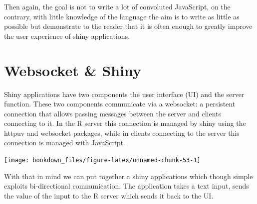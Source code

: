 \documentclass[
]{krantz}
\makeatletter
\newenvironment{Shaded}{\begin{snugshade}}{\end{snugshade}}
\newcommand{\ControlFlowTok}[1]{\textcolor[rgb]{0.27,0.27,0.27}{\textbf{#1}}}
\newcommand{\KeywordTok}[1]{\textcolor[rgb]{0.27,0.27,0.27}{\textbf{#1}}}
\newcommand{\NormalTok}[1]{#1}
\newcommand{\OperatorTok}[1]{\textcolor[rgb]{0.43,0.43,0.43}{\textbf{#1}}}
\newcommand{\StringTok}[1]{\textcolor[rgb]{0.5,0.5,0.5}{#1}}
\newenvironment{kframe}{%
\medskip{}
\setlength{\fboxsep}{.8em}
 \def\at@end@of@kframe{}%
 \ifinner\ifhmode%
  \def\at@end@of@kframe{\end{minipage}}%
  \begin{minipage}{\columnwidth}%
 \fi\fi%
 \def\FrameCommand##1{\hskip\@totalleftmargin \hskip-\fboxsep
 \colorbox{shadecolor}{##1}\hskip-\fboxsep
     \hskip-\linewidth \hskip-\@totalleftmargin \hskip\columnwidth}%
 \MakeFramed {\advance\hsize-\width
   \@totalleftmargin\z@ \linewidth\hsize
   \@setminipage}}%
 {\par\unskip\endMakeFramed%
 \at@end@of@kframe}
\renewenvironment{Shaded}{\begin{kframe}}{\end{kframe}}
\makeatother
\begin{document}
Then again, the goal is not to write a lot of convoluted JavaScript, on the contrary, with little knowledge of the language the aim is to write as little as possible but demonstrate to the reader that it is often enough to greatly improve the user experience of shiny applications.

\hypertarget{shiny-intro-websocket}{%
\section{Websocket \& Shiny}\label{shiny-intro-websocket}}

Shiny applications have two components the user interface (UI) and the server function. These two components communicate via a websocket: a persistent connection that allows passing messages between the server and clients connecting to it. In the R server this connection is managed by shiny using the httpuv \citep{R-httpuv} and websocket \citep{R-websocket} packages, while in clients connecting to the server this connection is managed with JavaScript.

\begin{center}\texttt{[image: bookdown\_files/figure-latex/unnamed-chunk-53-1]} \end{center}

With that in mind we can put together a shiny applications which though simple exploits bi-directional communication. The application takes a text input, sends the value of the input to the R server which sends it back to the UI.

\begin{Shaded}
\end{Shaded}
\end{document}
